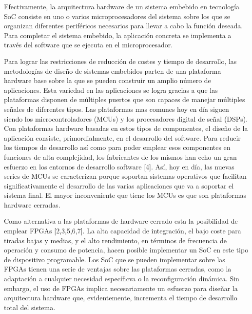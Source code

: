 Efectivamente, la arquitectura hardware de un sistema embebido en tecnología SoC consiste en uno o varios microprocesadores del sistema sobre los que se 
organizan diferentes periféricos necesarios para llevar a cabo la función deseada. Para completar el sistema embebido, la aplicación concreta se implementa a través del software que se ejecuta en el microprocesador.

Para lograr las restricciones de reducción de costes y tiempo de desarrollo, las metodologías de diseño de sistemas embebidos parten de una plataforma hardware 
base sobre la que se pueden construir un amplio número de aplicaciones. Esta variedad en las aplicaciones se logra gracias a que las plataformas disponen de  múltiples puertos que son capaces de manejar múltiples  señales de diferentes tipos. Las plataformas mas 
comunes hoy en día siguen siendo los  microcontroladores (MCUs) y los procesadores digital  de señal (DSPs). Con plataformas hardware basadas en  estos tipos de componentes, el diseño de la aplicación consiste, primordialmente, en el desarrollo del software. 
Para reducir los tiempos de desarrollo así como para poder emplear esos componentes en funciones de alta complejidad, los fabricantes de los mismos han echo un 
gran esfuerzo en los entornos de desarrollo software [4].
Así, hoy en día, las nuevas series de MCUs se caracterizan porque soportan sistemas operativos que facilitan significativamente el desarrollo de las varias 
aplicaciones que va a soportar el sistema final.
El mayor inconveniente que tiene los MCUs es que son plataformas hardware cerradas. 

Como alternativa a las plataformas de hardware cerrado esta la posibilidad de emplear FPGAs [2,3,5,6,7]. La alta capacidad de integración, el bajo coste para tiradas bajas 
y medias, y el alto rendimiento, en términos de frecuencia de operación y consumo de potencia, hacen posible implementar un SoC en este tipo de dispositivo 
programable. Los SoC que se pueden implementar sobre las FPGAs tienen una serie de ventajas sobre las plataformas cerradas, como la adaptación a cualquier 
necesidad específicva o la reconfiguración dinámica. 
Sin embargo, el uso de FPGAs implica necesariamente un esfuerzo para diseñar la arquitectura hardware que, evidentemente, incrementa el tiempo de desarrollo total 
del sistema.

